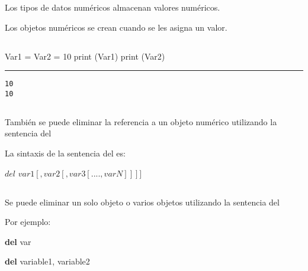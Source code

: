 \documentclass[]{article}
\newenvironment{Shaded}{}{}
\newcommand{\KeywordTok}[1]{\textcolor[rgb]{0.00,0.44,0.13}{\textbf{#1}}}
\newcommand{\DecValTok}[1]{\textcolor[rgb]{0.25,0.63,0.44}{#1}}
\newcommand{\OperatorTok}[1]{\textcolor[rgb]{0.40,0.40,0.40}{#1}}
\newcommand{\BuiltInTok}[1]{#1}
\newcommand{\NormalTok}[1]{#1}
\begin{document}
Los tipos de datos numéricos almacenan valores numéricos.

Los objetos numéricos se crean cuando se les asigna un valor.

\subsection{}\label{section-17}

\begin{Shaded}
\begin{Highlighting}[]
\NormalTok{Var1 }\OperatorTok{=}\NormalTok{ Var2 }\OperatorTok{=} \DecValTok{10}
\BuiltInTok{print}\NormalTok{ (Var1)}
\BuiltInTok{print}\NormalTok{ (Var2)}
\end{Highlighting}
\end{Shaded}

\begin{center}\rule{0.5\linewidth}{\linethickness}\end{center}

\begin{verbatim}
10
10
\end{verbatim}

\subsection{}\label{section-18}

También se puede eliminar la referencia a un objeto numérico utilizando
la sentencia del

La sintaxis de la sentencia del es:

\(del\) \(var1 [, var2 [, var3 [...., varN]]]]\)

\subsection{}\label{section-19}

Se puede eliminar un solo objeto o varios objetos utilizando la
sentencia del

Por ejemplo:

\begin{Shaded}
\begin{Highlighting}[]
\KeywordTok{del}\NormalTok{ var}

\KeywordTok{del}\NormalTok{ variable1, variable2}
\end{Highlighting}
\end{Shaded}

\subsection{}\label{section-20}
\end{document}

